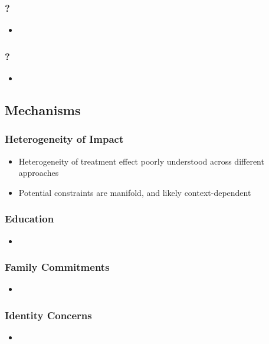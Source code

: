 \documentclass[10pt]{beamer}
\begin{document}
\begin{frame}
\frametitle{?}
	\begin{itemize}
	\item 
	\vspace{0.1in}
	\end{itemize}
\end{frame}

\begin{frame}
\frametitle{?}
	\begin{itemize}
	\item 
	\vspace{0.1in}
	\end{itemize}
\end{frame}


\subsection{Mechanisms}

\begin{frame}
\frametitle{Heterogeneity of Impact}
	\begin{itemize}
	\item Heterogeneity of treatment effect poorly understood across different approaches
	\item Potential constraints are manifold, and likely context-dependent
	\vspace{0.1in}
	\end{itemize}
\end{frame}

\begin{frame}
\frametitle{Education}
	\begin{itemize}
	\item 
	\vspace{0.1in}
	\end{itemize}
\end{frame}

\begin{frame}
\frametitle{Family Commitments}
	\begin{itemize}
	\item 
	\vspace{0.1in}
	\end{itemize}
\end{frame}

\begin{frame}
\frametitle{Identity Concerns}
	\begin{itemize}
	\item 
	\vspace{0.1in}
	\end{itemize}
\end{frame}
\end{document}
